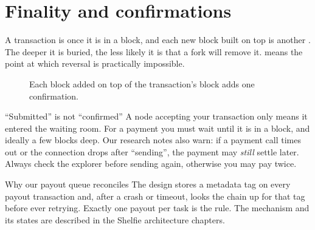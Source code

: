 \section{Finality and confirmations}

A transaction is  once it is in a block, and each new block built on top is another . The deeper it is buried, the less likely it is that a fork will remove it.  means the point at which reversal is practically impossible.

\begin{figure}[h]
\centering
{}
\caption{Each block added on top of the transaction's block adds one confirmation.}
\end{figure}

\begin{warningbox}{``Submitted'' is not ``confirmed''}
A node accepting your transaction only means it entered the waiting room. For a payment you must wait until it is in a block, and ideally a few blocks deep. Our research notes also warn: if a payment call times out or the connection drops after ``sending'', the payment may \emph{still} settle later. Always check the explorer before sending again, otherwise you may pay twice.
\end{warningbox}

\begin{shelfiebox}{Why our payout queue reconciles}
The design stores a metadata tag on every payout transaction and, after a crash or timeout, looks the chain up for that tag before ever retrying. Exactly one payout per task is the rule. The mechanism and its states are described in the Shelfie architecture chapters.
\end{shelfiebox}

